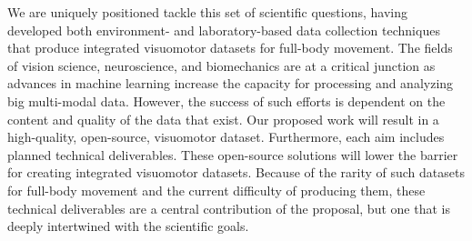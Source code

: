 We are uniquely positioned tackle this set of scientific questions, having developed both environment- and laboratory-based data collection techniques that produce integrated visuomotor datasets for full-body movement.  The fields of vision science, neuroscience, and biomechanics are at a critical junction as advances in machine learning increase the capacity for processing and analyzing big multi-modal data.  However, the success of such efforts is dependent on the content and quality of the data that exist.  Our proposed work will result in a high-quality, open-source, visuomotor dataset.  Furthermore, each aim includes planned technical deliverables.  These open-source solutions will lower the barrier for creating integrated visuomotor datasets. Because of the rarity of such datasets for full-body movement and the current difficulty of producing them, these technical deliverables are a central contribution of the proposal, but one that is deeply intertwined with the scientific goals.



